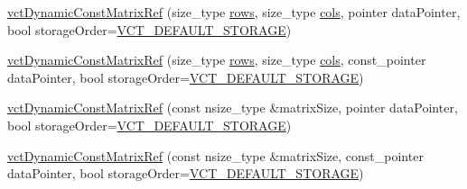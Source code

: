 {\bf }\par
\begin{DoxyCompactItemize}
\item 
\hyperlink{classvct_dynamic_const_matrix_ref_a79de2ff0f28735135f02e5faeeb2b4ec}{vct\-Dynamic\-Const\-Matrix\-Ref} (size\-\_\-type \hyperlink{classvct_dynamic_const_matrix_base_a5eac13be2207ebeb8766cde379d73438}{rows}, size\-\_\-type \hyperlink{classvct_dynamic_const_matrix_base_aa6c51d41a100da49a7e7ac7edb20ecd9}{cols}, pointer data\-Pointer, bool storage\-Order=\hyperlink{vct_forward_declarations_8h_aacdb3b0140beef8a3c2025b808b74a73}{V\-C\-T\-\_\-\-D\-E\-F\-A\-U\-L\-T\-\_\-\-S\-T\-O\-R\-A\-G\-E})
\item 
\hyperlink{classvct_dynamic_const_matrix_ref_a8a0633710caa3bc511cdb9a47b61c998}{vct\-Dynamic\-Const\-Matrix\-Ref} (size\-\_\-type \hyperlink{classvct_dynamic_const_matrix_base_a5eac13be2207ebeb8766cde379d73438}{rows}, size\-\_\-type \hyperlink{classvct_dynamic_const_matrix_base_aa6c51d41a100da49a7e7ac7edb20ecd9}{cols}, const\-\_\-pointer data\-Pointer, bool storage\-Order=\hyperlink{vct_forward_declarations_8h_aacdb3b0140beef8a3c2025b808b74a73}{V\-C\-T\-\_\-\-D\-E\-F\-A\-U\-L\-T\-\_\-\-S\-T\-O\-R\-A\-G\-E})
\item 
\hyperlink{classvct_dynamic_const_matrix_ref_a37c64ae8926df315560b5aa27f37b49d}{vct\-Dynamic\-Const\-Matrix\-Ref} (const nsize\-\_\-type \&matrix\-Size, pointer data\-Pointer, bool storage\-Order=\hyperlink{vct_forward_declarations_8h_aacdb3b0140beef8a3c2025b808b74a73}{V\-C\-T\-\_\-\-D\-E\-F\-A\-U\-L\-T\-\_\-\-S\-T\-O\-R\-A\-G\-E})
\item 
\hyperlink{classvct_dynamic_const_matrix_ref_a80b76aace4992dd54c7dc39e6bc3daba}{vct\-Dynamic\-Const\-Matrix\-Ref} (const nsize\-\_\-type \&matrix\-Size, const\-\_\-pointer data\-Pointer, bool storage\-Order=\hyperlink{vct_forward_declarations_8h_aacdb3b0140beef8a3c2025b808b74a73}{V\-C\-T\-\_\-\-D\-E\-F\-A\-U\-L\-T\-\_\-\-S\-T\-O\-R\-A\-G\-E})
\end{DoxyCompactItemize}

